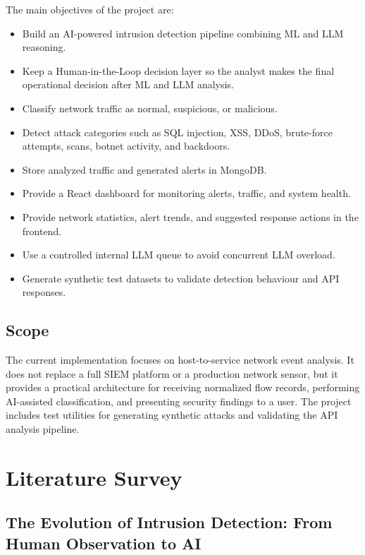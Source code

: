 \documentclass[12pt,a4paper]{report}
\begin{document}
The main objectives of the project are:

\begin{itemize}[leftmargin=1.5em]
  \item Build an AI-powered intrusion detection pipeline combining ML and LLM
    reasoning.
  \item Keep a Human-in-the-Loop decision layer so the analyst makes the final
    operational decision after ML and LLM analysis.
  \item Classify network traffic as normal, suspicious, or malicious.
  \item Detect attack categories such as SQL injection, XSS, DDoS,
    brute-force attempts, scans, botnet activity, and backdoors.
  \item Store analyzed traffic and generated alerts in MongoDB.
  \item Provide a React dashboard for monitoring alerts, traffic, and system
    health.
  \item Provide network statistics, alert trends, and suggested response
    actions in the frontend.
  \item Use a controlled internal LLM queue to avoid concurrent LLM overload.
  \item Generate synthetic test datasets to validate detection behaviour and
    API responses.
\end{itemize}

\section{Scope}

The current implementation focuses on host-to-service network event analysis.
It does not replace a full SIEM platform or a production network sensor, but
it provides a practical architecture for receiving normalized flow records,
performing AI-assisted classification, and presenting security findings to a
user. The project includes test utilities for generating synthetic attacks
and validating the API analysis pipeline.

\chapter{Literature Survey}

\section{The Evolution of Intrusion Detection: From Human Observation to AI}
\end{document}

